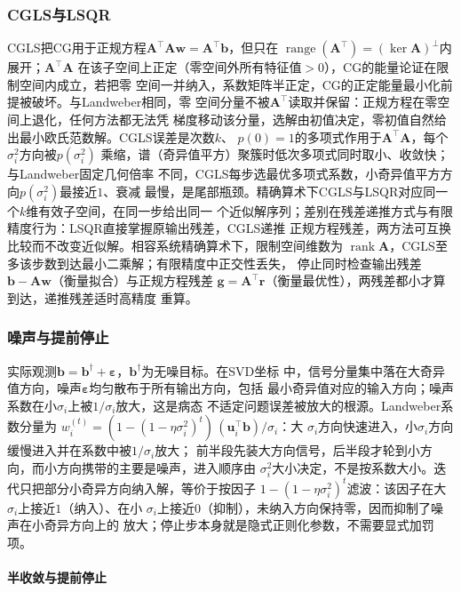 \subsubsection{CGLS与LSQR}

CGLS把CG用于正规方程$\bm A^{\top}\bm A\bm w=\bm A^{\top}\bm b$，但只在
$\operatorname{range}(\bm A^{\top})=(\ker\bm A)^\perp$内展开；$\bm A^{\top}\bm A$
在该子空间上正定（零空间外所有特征值$>0$），CG的能量论证在限制空间内成立，若把零
空间一并纳入，系数矩阵半正定，CG的正定能量最小化前提被破坏。与Landweber相同，零
空间分量不被$\bm A^{\top}$读取并保留：正规方程在零空间上退化，任何方法都无法凭
梯度移动该分量，选解由初值决定，零初值自然给出最小欧氏范数解。CGLS误差是次数$k$、
$p(0)=1$的多项式作用于$\bm A^{\top}\bm A$，每个$\sigma_i^2$方向被$p(\sigma_i^2)$
乘缩，谱（奇异值平方）聚簇时低次多项式同时取小、收敛快；与Landweber固定几何倍率
不同，CGLS每步选最优多项式系数，小奇异值平方方向$p(\sigma_i^2)$最接近$1$、衰减
最慢，是尾部瓶颈。精确算术下CGLS与LSQR对应同一个$k$维有效子空间，在同一步给出同一
个近似解序列；差别在残差递推方式与有限精度行为：LSQR直接掌握原输出残差，CGLS递推
正规方程残差，两方法可互换比较而不改变近似解。相容系统精确算术下，限制空间维数为
$\operatorname{rank}\bm A$，CGLS至多该步数到达最小二乘解；有限精度中正交性丢失，
停止同时检查输出残差$\bm b-\bm A\bm w$（衡量拟合）与正规方程残差
$\bm g=\bm A^{\top}\bm r$（衡量最优性），两残差都小才算到达，递推残差适时高精度
重算。

\subsubsection{噪声与提前停止}

实际观测$\bm b=\bm b^\dagger+\bm\varepsilon$，$\bm b^\dagger$为无噪目标。在SVD坐标
中，信号分量集中落在大奇异值方向，噪声$\bm\varepsilon$均匀散布于所有输出方向，包括
最小奇异值对应的输入方向；噪声系数在小$\sigma_i$上被$1/\sigma_i$放大，这是病态
不适定问题误差被放大的根源。Landweber系数分量为
$w_i^{(t)}=(1-(1-\eta\sigma_i^2)^t)\,(\bm u_i^{\top}\bm b)/\sigma_i$：大
$\sigma_i$方向快速进入，小$\sigma_i$方向缓慢进入并在系数中被$1/\sigma_i$放大；
前半段先装大方向信号，后半段才轮到小方向，而小方向携带的主要是噪声，进入顺序由
$\sigma_i^2$大小决定，不是按系数大小。迭代只把部分小奇异方向纳入解，等价于按因子
$1-(1-\eta\sigma_i^2)^t$滤波：该因子在大$\sigma_i$上接近$1$（纳入）、在小
$\sigma_i$上接近$0$（抑制），未纳入方向保持零，因而抑制了噪声在小奇异方向上的
放大；停止步本身就是隐式正则化参数，不需要显式加罚项。

\paragraph{半收敛与提前停止}

